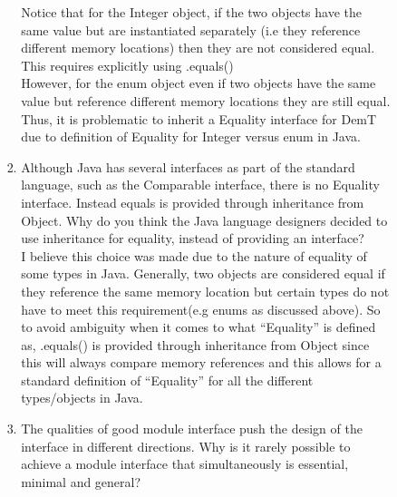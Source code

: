 \documentclass[12pt]{article}
\begin{document}
\begin{itemize}
\begin{itemize}
\begin{itemize}
\begin{enumerate}
Notice that for the Integer object, if the two objects have the same value but are instantiated separately (i.e they reference different memory locations) then they are not considered equal. This requires explicitly using .equals()\\

However, for the enum object even if two objects have the same value but reference different memory locations they are still equal. Thus, it is problematic to inherit a Equality interface for DemT due to definition of Equality for Integer versus enum in Java.
  
  
\item Although Java has several interfaces as part of the standard language,
  such as the Comparable interface, there is no Equality interface.  Instead
  equals is provided through inheritance from Object.  Why do you think the
  Java language designers decided to use inheritance for equality, instead of
  providing an interface?\\
  
  I believe this choice was made due to the nature of equality of some types in Java. Generally, two objects are considered equal if they reference the same memory location but certain types do not have to meet this requirement(e.g enums as discussed above). So to avoid ambiguity when it comes to what ``Equality'' is defined as, .equals() is provided through inheritance from Object since this will always compare memory references and this allows for a standard definition of ``Equality'' for all the different types/objects in Java.
  
\item The qualities of good module interface push the design of the interface in
  different directions. Why is it rarely possible to achieve a module interface
  that simultaneously is essential, minimal and general?\\
  

\end{enumerate}
\end{itemize}
\end{itemize}
\end{itemize}
\end{document}
